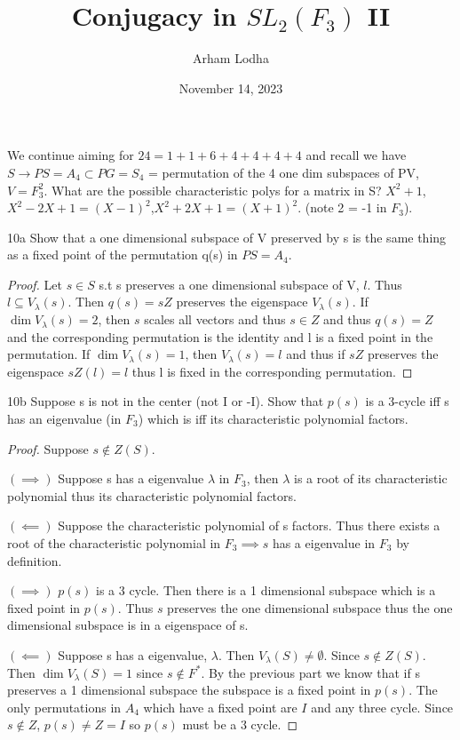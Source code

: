 \documentclass{article}
\begin{document}
\title{Conjugacy in $SL_2(F_3)$ II}
\author{Arham Lodha}%
\date{November 14, 2023}%
\maketitle

We continue aiming for $24 = 1 + 1 + 6 + 4 + 4 + 4 + 4$ and recall we have $S \to PS = A_4 \subset PG = S_4$ = permutation of the 4 one dim subspaces of PV, $V = F_3^2$. What are the possible characteristic polys for a matrix in S? $X^2 + 1$, $X^2 - 2 X + 1 = (X-1)^2$,$X^2 + 2X + 1 = (X + 1)^2$. (note 2 = -1 in $F_3$). 

\begin{PROB}{10a}\label{Problem 1a.}
    Show that a one dimensional subspace of V preserved by s is the same thing as a fixed point of the permutation q(s) in $PS = A_4$. 
\end{PROB}
\begin{proof}
    Let $s \in S$ s.t s preserves a one dimensional subspace of V, $l$. Thus $l \subseteq V_\lambda(s)$. Then $q(s) = sZ$ preserves the eigenspace $V_\lambda(s)$. If $\dim V_\lambda(s) = 2$, then $s$ scales all vectors and thus $s \in Z$ and thus $q(s) = Z$ and the corresponding permutation is the identity and l is a fixed point in the permutation. If $\dim V_\lambda(s) = 1$, then $V_\lambda(s) = l$ and thus if $sZ$ preserves the eigenspace $sZ(l) = l$ thus l is fixed in the corresponding permutation. 
\end{proof}
\begin{PROB}{10b}\label{Problem 1b.}
    Suppose s is not in the center (not I or -I). Show that $p(s)$ is a 3-cycle iff s has an eigenvalue (in $F_3$) which is iff its characteristic polynomial factors.
\end{PROB}
\begin{proof}
    Suppose $s \not \in Z(S)$. 

    $(\implies)$ Suppose s has a eigenvalue $\lambda$ in $F_3$, then $\lambda$ is a root of its characteristic polynomial thus its characteristic polynomial factors.

    $(\impliedby)$ Suppose the characteristic polynomial of s factors. Thus there exists a root of the characteristic polynomial in $F_3 \implies s$ has a eigenvalue in $F_3$ by definition.

    $(\implies)$ $p(s)$ is a 3 cycle. Then there is a 1 dimensional subspace which is a fixed point in $p(s)$. Thus $s$ preserves the one dimensional subspace thus the one dimensional subspace is in a eigenspace of s.

    $(\impliedby)$ Suppose s has a eigenvalue, $\lambda$. Then $V_\lambda(S) \neq \emptyset$. Since $s \not \in Z(S)$. Then $\dim V_\lambda(S) = 1$ since $s \not \in F^*$. By the previous part we know that if s preserves a 1 dimensional subspace the subspace is a fixed point in $p(s)$. The only permutations in $A_4$ which have a fixed point are $I$ and any three cycle. Since $s \not \in Z$, $p(s) \neq Z = I$ so $p(s)$ must be a 3 cycle.
\end{proof}
\end{document}
